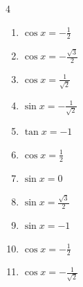 \begin{multicols}{4}
\begin{enumerate}
  \item $\displaystyle \cos{x}  = -\frac{1}{2}$


  \item $\displaystyle \cos{x}  = -\frac{\sqrt{3}}{2}$


  \item $\displaystyle \cos{x}  = \frac{1}{\sqrt{2}}$


\columnbreak %

  \item $\displaystyle \sin{x}  = -\frac{1}{\sqrt{2}}$


  \item $\displaystyle \tan{x}  = -1$


  \item $\displaystyle \cos{x}  = \frac{1}{2}$


  \item $\displaystyle \sin{x}  = 0$


  \item $\displaystyle \sin{x}  = \frac{\sqrt{3}}{2}$


  \item $\displaystyle \sin{x}  = -1$


  \item $\displaystyle \cos{x}  = -\frac{1}{2}$


  \item $\displaystyle \cos{x}  = -\frac{1}{\sqrt{2}}$



\end{enumerate}
\end{multicols}
